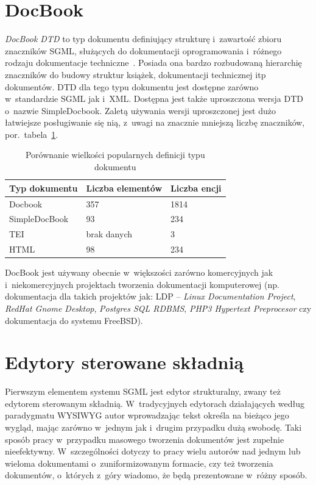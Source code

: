 \documentclass[brudnopis]{xmgr}
\begin{document}
\section{DocBook}
\emph{DocBook DTD} to typ dokumentu definiujący
strukturę i~zawartość zbioru znaczników SGML, służących do
dokumentacji oprogramowania i~różnego rodzaju dokumentacje
techniczne~\cite[s.~123]{Elmasri:2002:CMC}. Posiada ona bardzo rozbudowaną
hierarchię znaczników do budowy struktur książek, dokumentacji
technicznej itp dokumentów.  DTD dla tego typu dokumentu jest dostępne
zarówno w~standardzie SGML jak i~XML. Dostępna jest także uproszczona
wersja DTD o~nazwie SimpleDocbook. Zaletą używania wersji uproszczonej
jest dużo łatwiejsze posługiwanie się nią, z~uwagi na znacznie
mniejszą liczbę znaczników, por.~tabela~\ref{tab:dtd-cmp}.

\begin{table}[!tbh]
\begin{tabular}{|l|l|l|} \hline
Typ dokumentu & Liczba elementów & Liczba encji \\ \hline
Docbook & 357 & 1814 \\ \hline
SimpleDocBook  & 93  & 234 \\ \hline
TEI & brak danych & 3 \\ \hline
HTML & 98  & 234 \\ \hline
\end{tabular}
\caption{Porównanie wielkości popularnych definicji 
  typu dokumentu\label{tab:dtd-cmp}}
\end{table}

DocBook jest używany obecnie w~większości zarówno komercyjnych jak
i~niekomercyjnych projektach tworzenia dokumentacji komputerowej
(np. dokumentacja dla takich projektów jak: LDP -- \textit{Linux
Documentation Project}, \textit{RedHat Gnome Desktop},
\textit{Postgres SQL RDBMS}, \textit{PHP3 Hypertext Preprocesor} czy
dokumentacja do systemu FreeBSD).
    
\section{Edytory sterowane składnią\label{s:edytor}}

Pierwszym elementem systemu SGML jest edytor
strukturalny, zwany też edytorem sterowanym
składnią. W~tradycyjnych edytorach działających według paradygmatu
WYSIWYG autor wprowadzając tekst określa na bieżąco
jego wygląd, mając zarówno w~jednym jak i~drugim przypadku dużą
swobodę.  Taki sposób pracy w~przypadku masowego tworzenia dokumentów
jest zupełnie nieefektywny. W~szczególności dotyczy to pracy wielu
autorów nad jednym lub wieloma dokumentami o~zuniformizowanym
formacie, czy też tworzenia dokumentów, o~których z~góry wiadomo, że
będą prezentowane w~różny sposób.
\end{document}
